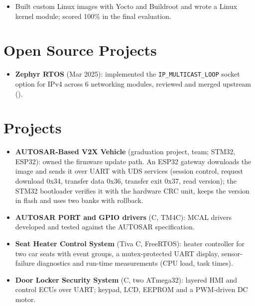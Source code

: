 \documentclass[10pt]{article}
\begin{document}
\begin{itemize}
  \item Built custom Linux images with Yocto and Buildroot and wrote a Linux kernel module; scored 100\% in the final evaluation.
\end{itemize}

\section*{Open Source Projects}
\begin{itemize}
  \item \textbf{Zephyr RTOS} (Mar 2025): implemented the \texttt{IP\_MULTICAST\_LOOP} socket option for IPv4 across 6 networking modules, reviewed and merged upstream ().
\end{itemize}

\section*{Projects}
\begin{itemize}
  \item \textbf{AUTOSAR-Based V2X Vehicle} (graduation project, team; STM32, ESP32): owned the firmware update path. An ESP32 gateway downloads the image and sends it over UART with UDS services (session control, request download 0x34, transfer data 0x36, transfer exit 0x37, read version); the STM32 bootloader verifies it with the hardware CRC unit, keeps the version in flash and uses two banks with rollback. 
  \item \textbf{AUTOSAR PORT and GPIO drivers} (C, TM4C): MCAL drivers developed and tested against the AUTOSAR specification.
  \item \textbf{Seat Heater Control System} (Tiva C, FreeRTOS): heater controller for two car seats with event groups, a mutex-protected UART display, sensor-failure diagnostics and run-time measurements (CPU load, task times). 
  \item \textbf{Door Locker Security System} (C, two ATmega32): layered HMI and control ECUs over UART; keypad, LCD, EEPROM and a PWM-driven DC motor. 
\end{itemize}
\end{document}
